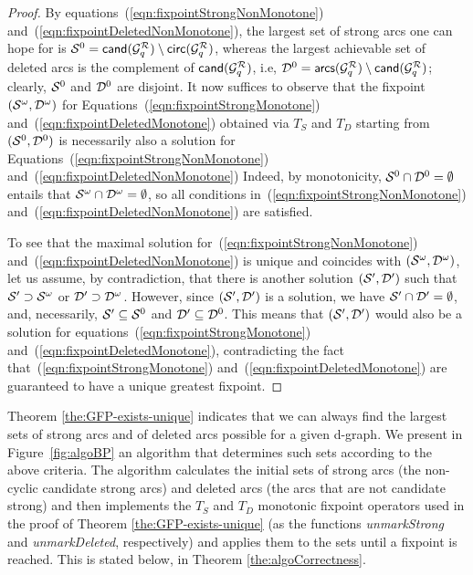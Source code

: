 \begin{proof}
By equations~(\ref{eqn:fixpointStrongNonMonotone}) and~(\ref{eqn:fixpointDeletedNonMonotone}), the largest set of strong arcs one can hope for is
$\S^{0}=\candStr(\GqR)\setminus\circularCand(\GqR)$,
whereas the largest achievable set of deleted arcs is the complement of $\candStr(\GqR)$, i.e, $\D^{0}=\arcs(\GqR)\setminus\candStr(\GqR)$; clearly, $\S^{0}$ and $\D^{0}$ are disjoint.
%
It now suffices to observe that the fixpoint $(\S^{\omega},\D^{\omega})$ for Equations~(\ref{eqn:fixpointStrongMonotone}) and~(\ref{eqn:fixpointDeletedMonotone}) obtained via $T_{S}$ and $T_{D}$ starting from $(\S^{0},\D^{0})$ is necessarily also a solution for
Equations~(\ref{eqn:fixpointStrongNonMonotone}) and~(\ref{eqn:fixpointDeletedNonMonotone})
Indeed, by monotonicity,
$\S^{0}\cap\D^{0}=\emptyset$ entails that $\S^{\omega}\cap \D^{\omega}=\emptyset$,
so all conditions in~(\ref{eqn:fixpointStrongNonMonotone}) and~(\ref{eqn:fixpointDeletedNonMonotone}) are satisfied.

To see that the maximal solution for~(\ref{eqn:fixpointStrongNonMonotone})
and~(\ref{eqn:fixpointDeletedNonMonotone}) is unique and coincides with
$(\S^{\omega},\D^{\omega})$, let us assume, by contradiction, that there is
another solution $(\S',\D')$ such that $\S'\supset \S^{\omega}$ or $\D'\supset
\D^{\omega}$. However, since $(\S',\D')$ is a solution, we have $\S'\cap
\D'=\emptyset$, and, necessarily, $\S'\subseteq \S^{0}$
and $\D'\subseteq \D^{0}$.
This means that
$(\S',\D')$ would also be a solution for
equations~(\ref{eqn:fixpointStrongMonotone})
and~(\ref{eqn:fixpointDeletedMonotone}), contradicting the fact
that~(\ref{eqn:fixpointStrongMonotone}) and~(\ref{eqn:fixpointDeletedMonotone})
are guaranteed to have a unique greatest fixpoint.

\end{proof}

Theorem \ref{the:GFP-exists-unique} indicates that we can always find the largest sets of strong arcs and of deleted arcs possible for a given d-graph.
%
We present in Figure~\ref{fig:algoBP} an algorithm
that determines such sets
according to the above criteria.  The algorithm calculates the initial sets of
strong arcs (the
non-cyclic
candidate strong arcs) and deleted arcs (the arcs that are not candidate strong) and
then implements the $T_{S}$ and $T_{D}$ monotonic fixpoint operators used in
the proof of Theorem \ref{the:GFP-exists-unique} (as the functions \textit{unmarkStrong} and \textit{unmarkDeleted}, respectively) and applies them to the sets until a fixpoint is reached.
This is stated below, in Theorem \ref{the:algoCorrectness}.

